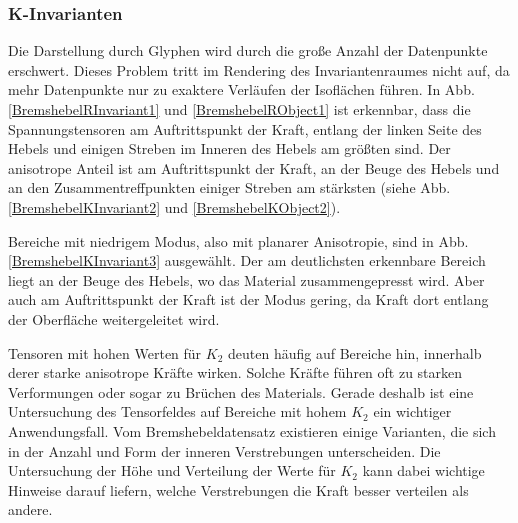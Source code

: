 \documentclass[a4paper,fontsize=12pt,toc=bib,halfparskip]{scrartcl}
\begin{document}
\subsubsection{K-Invarianten}
Die Darstellung durch Glyphen wird durch die gro{\ss}e Anzahl der Datenpunkte erschwert. Dieses Problem tritt im Rendering des Invariantenraumes nicht auf, da mehr Datenpunkte nur zu exaktere Verl\"aufen der Isofl\"achen f\"uhren. In Abb. \ref{BremshebelRInvariant1} und \ref{BremshebelRObject1} ist erkennbar, dass die Spannungstensoren am Auftrittspunkt der Kraft, entlang der linken Seite des Hebels und einigen Streben im Inneren des Hebels am gr\"o{\ss}ten sind. Der anisotrope Anteil ist am Auftrittspunkt der Kraft, an der Beuge des Hebels und an den Zusammentreffpunkten einiger Streben am st\"arksten (siehe Abb. \ref{BremshebelKInvariant2} und \ref{BremshebelKObject2}).

Bereiche mit niedrigem Modus, also mit planarer Anisotropie, sind in Abb. \ref{BremshebelKInvariant3} ausgew\"ahlt. Der am deutlichsten erkennbare Bereich liegt an der Beuge des Hebels, wo das Material zusammengepresst wird. Aber auch am Auftrittspunkt der Kraft ist der Modus gering, da Kraft dort entlang der Oberfl\"ache weitergeleitet wird.

Tensoren mit hohen Werten f\"ur $K_2$ deuten h\"aufig auf Bereiche hin, innerhalb derer starke anisotrope Kr\"afte wirken. Solche Kr\"afte f\"uhren oft zu starken Verformungen oder sogar zu Br\"uchen des Materials. Gerade deshalb ist eine Untersuchung des Tensorfeldes auf Bereiche mit hohem $K_2$ ein wichtiger Anwendungsfall. Vom Bremshebeldatensatz existieren einige Varianten, die sich in der Anzahl und Form der inneren Verstrebungen unterscheiden. Die Untersuchung der H\"ohe und Verteilung der Werte f\"ur $K_2$ kann dabei wichtige Hinweise darauf liefern, welche Verstrebungen die Kraft besser verteilen als andere. 
\end{document}
